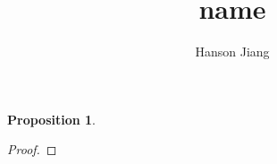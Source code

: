 \documentclass[12pt]{article}
\newtheorem{proposition}{Proposition}
\begin{document}
\title{name}
\author{Hanson Jiang}
\maketitle

\begin{proposition}

\end{proposition}

\begin{proof}

\end{proof}
\end{document}
